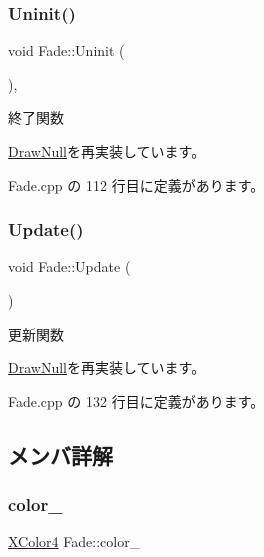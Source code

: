 \subsubsection{\texorpdfstring{Uninit()}{Uninit()}}
{\footnotesize\ttfamily void Fade\+::\+Uninit (\begin{DoxyParamCaption}{ }\end{DoxyParamCaption})\hspace{0.3cm}{\ttfamily [override]}, {\ttfamily [virtual]}}



終了関数 



\mbox{\hyperlink{class_draw_null_a6e81d63efab7333e8d0e8af99362a4d9}{Draw\+Null}}を再実装しています。



 Fade.\+cpp の 112 行目に定義があります。

\mbox{\label{class_fade_a1579b5b9020344a1131ea11c15f2c0bd}} 
\subsubsection{\texorpdfstring{Update()}{Update()}}
{\footnotesize\ttfamily void Fade\+::\+Update (\begin{DoxyParamCaption}{ }\end{DoxyParamCaption})\hspace{0.3cm}{\ttfamily [virtual]}}



更新関数 



\mbox{\hyperlink{class_draw_null_ad32a508d269de7eda8ad24ea72230464}{Draw\+Null}}を再実装しています。



 Fade.\+cpp の 132 行目に定義があります。



\subsection{メンバ詳解}
\mbox{\label{class_fade_af3b40978f7e38980379c9189aadcf310}} 
\subsubsection{\texorpdfstring{color\+\_\+}{color\_}}
{\footnotesize\ttfamily \mbox{\hyperlink{_vector3_d_8h_a680c30c4a07d86fe763c7e01169cd6cc}{X\+Color4}} Fade\+::color\+\_\+\hspace{0.3cm}{\ttfamily [private]}}



